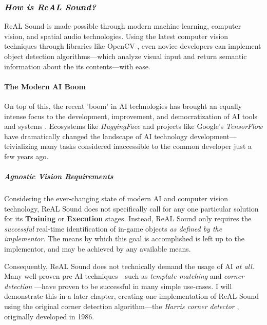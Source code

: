 \documentclass{report}
\newcommand{\rs}{ReAL Sound\xspace}
\begin{document}
\subsubsection{\emph{How is \rs?}}
\rs is made possible through modern machine learning, computer vision, and spatial audio technologies. Using the latest computer vision techniques through libraries like OpenCV \cite{opencv_library}, even novice developers can implement object detection algorithms---which analyze visual input and return semantic information about the its contents---with ease. 

\paragraph{The Modern AI Boom}

On top of this, the recent 'boom' in AI technologies \cite{Knight_2023} \cite{Meredith_2023} has brought an equally intense focus to the development, improvement, and democratization of AI tools and systems \cite{Brynjolfsson_McAfee_2017} \cite{Heikkilä_2022}. Ecosystems like \emph{HuggingFace} \cite{Wiggers_2022} and projects like Google's \emph{TensorFlow} \cite{tensorflow2015-whitepaper} have dramatically changed the landscape of AI technology development---trivializing many tasks considered inaccessible to the common developer just a few years ago.

\subparagraph{Agnostic Vision Requirements}

Considering the ever-changing state of modern AI and computer vision technology, \rs does not specifically call for any one particular solution for its \textbf{Training} or \textbf{Execution} stages. Instead, \rs only requires the \emph{successful} real-time identification of in-game objects \textit{as defined by the implementor}. The means by which this goal is accomplished is left up to the implementor, and may be achieved by any available means. 

Consequently, \rs does not technically demand the usage of AI \emph{at all.} Many well-proven pre-AI techniques---such as \emph{template matching} \cite{Brunelli2009-gh} and \emph{corner detection} \cite{Hildreth1980}---have proven to be successful in many simple use-cases. I will demonstrate this in a later chapter, creating one  implementation of \rs using the original corner detection algorithm---the \emph{Harris corner detector} \cite{Harris}, originally developed in 1986. 
\end{document}
